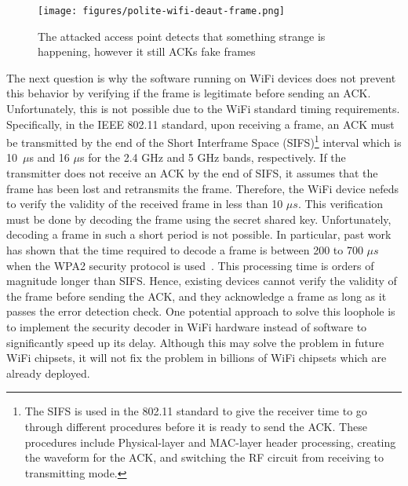 \begin{figure}[t!]
    \centering
    \texttt{[image: figures/polite-wifi-deaut-frame.png]}
    \caption{The attacked access point detects that something strange is happening, however it still ACKs fake frames}
    \label{fig:deauth-rts-cts}
\end{figure}


The next question is why the software running on WiFi devices does not prevent this behavior by verifying if the frame is legitimate before sending an ACK. Unfortunately, this is not possible due to the WiFi standard timing requirements. Specifically, in the IEEE 802.11 standard, upon receiving a frame, an ACK must be transmitted by the end of the Short Interframe Space (SIFS)\footnote{The SIFS is used in the 802.11 standard to give the receiver time to go through different procedures before it is ready to send the ACK.
These procedures include Physical-layer and MAC-layer header processing, creating the waveform for the ACK, and switching the RF circuit from receiving to transmitting mode.
} interval which is 10~$\mu$s and 16 $\mu$s for the 2.4 GHz and 5 GHz bands, respectively.
If the transmitter does not receive an ACK by the end of SIFS, it assumes that the frame has
been lost and retransmits the frame. Therefore, the WiFi device nefeds to verify the validity of the received frame in less than 10 $\mu s$. This verification must be done by decoding the frame using the secret shared key. Unfortunately, decoding a frame in such a short period is not possible. In particular, past work has shown that the time required to decode a frame is between 200 to 700 $\mu s$ when the WPA2 security protocol is used~\cite{decoding-time-1, decoding-time-2, decoding-time-3}. This processing time is orders of magnitude longer than SIFS. Hence, existing devices cannot verify the validity of the frame before sending the ACK, and they acknowledge a frame as long as it passes the error detection check. One potential approach to solve this loophole is to implement the security decoder in WiFi hardware instead of software to significantly speed up its delay. Although this may solve the problem in future WiFi chipsets, it will not fix the problem in billions of WiFi chipsets which are already deployed. 




